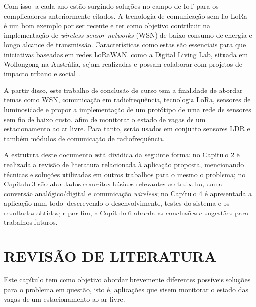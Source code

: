 \documentclass[oneside,openright,12pt]{ufsm_2015} %
\begin{document}
{Com isso, a cada ano estão surgindo soluções no campo de IoT para os complicadores anteriormente citados. A tecnologia de comunicação sem fio LoRa é um bom exemplo por ser recente e ter como objetivo contribuir na implementação de \textit{wireless sensor networks} (WSN) de baixo consumo de energia e longo alcance de transmissão. Características como estas são essenciais para que iniciativas baseadas em redes LoRaWAN, como a Digital Living Lab, situada em Wollongong na Austrália, sejam realizadas e possam colaborar com projetos de impacto urbano e social \cite{site:dll}. 


A partir disso, este trabalho de conclusão de curso tem a finalidade de abordar temas como WSN, comunicação em radiofrequência, tecnologia LoRa, sensores de luminosidade e propor a implementação de um protótipo de uma rede de sensores sem fio de baixo custo, afim de monitorar o estado de vagas de um estacionamento ao ar livre. Para tanto, serão usados em conjunto sensores LDR e também módulos de comunicação de radiofrequência.

A estrutura deste documento está dividida da seguinte forma: no Capítulo 2 é realizada a revisão de literatura relacionada à aplicação proposta, mencionando técnicas e soluções utilizadas em outros trabalhos para o mesmo o problema; no Capítulo 3 são abordados conceitos básicos relevantes ao trabalho, como conversão analógico/digital e comunicação \textit{wireless}; no Capítulo 4 é apresentada a aplicação num todo, descrevendo o desenvolvimento, testes do sistema e os resultados obtidos; e por fim, o Capítulo 6 aborda as conclusões e sugestões para trabalhos futuros.
}%
\geraintro  %
\chapter{REVISÃO DE LITERATURA}
Este capítulo tem como objetivo abordar brevemente diferentes possíveis soluções para o problema em questão, isto é, aplicações que visem monitorar o estado das vagas de um estacionamento ao ar livre.
\end{document}
